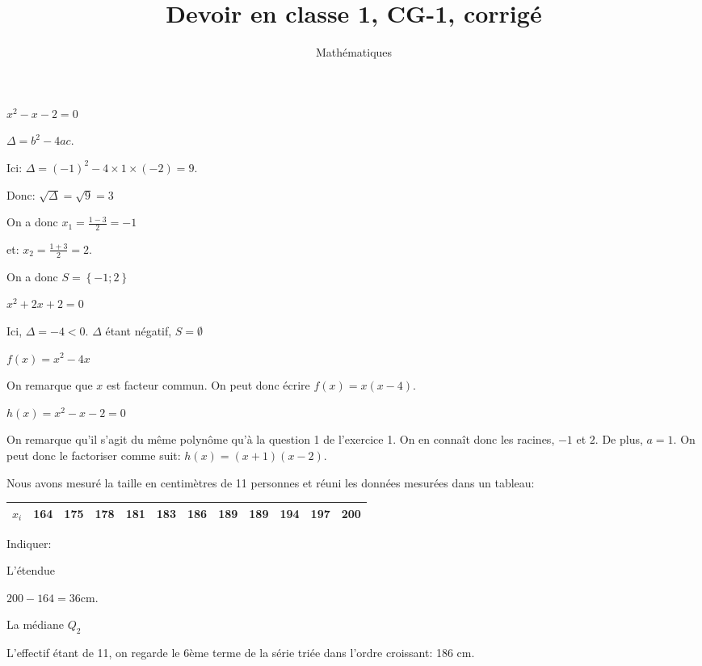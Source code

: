 \documentclass[a4paper,12pt]{scrartcl}
\date{}
\title{Devoir en classe 1, CG-1, corrigé}
\author{Mathématiques}
\begin{document}
\maketitle


\question{}
$x^2-x-2=0$

$\Delta = b^2-4ac$.

Ici: $\Delta = (-1)^2-4 \times 1 \times (-2) = 9$.

Donc: $\sqrt{\Delta} = \sqrt{9} = 3$

On a donc $x_1 = \frac{1-3}{2} = -1$

et: $x_2 = \frac{1+3}{2} = 2$.

On a donc $S = \left\lbrace -1 ; 2 \right\rbrace$

\question{}
$x^2+2x+2=0$

Ici, $\Delta = -4 < 0$. $\Delta$ étant négatif, $S = \emptyset$


\question{}
$f(x) = x^2 - 4x$

On remarque que $x$ est facteur commun. On peut donc écrire $f(x) = x(x-4)$.

\question{}
$h(x) = x^2-x-2=0$

On remarque qu'il s'agit du même polynôme qu'à la question 1 de l'exercice 1. On en connaît donc les racines, $-1$ et $2$. De plus, $a = 1$. On peut donc le factoriser comme suit: $h(x) = (x+1)\left(x - 2\right)$.


Nous avons mesuré la taille en centimètres de 11 personnes et réuni les données mesurées dans un tableau:

\begin{center}
\begin{tabular}{|l|l|l|l|l|l|l|l|l|l|l|l|}
\hline
$x_i$ & 164 & 175 & 178 & 181 & 183 & 186 & 189 & 189 & 194 & 197 & 200 \\ \hline
\end{tabular}
\end{center}

Indiquer:

\question{}
L'étendue

$200 - 164 = 36$cm.

\question{}
La médiane $Q_2$

L'effectif étant de 11, on regarde le 6ème terme de la série triée dans l'ordre croissant: 186 cm.
\end{document}
